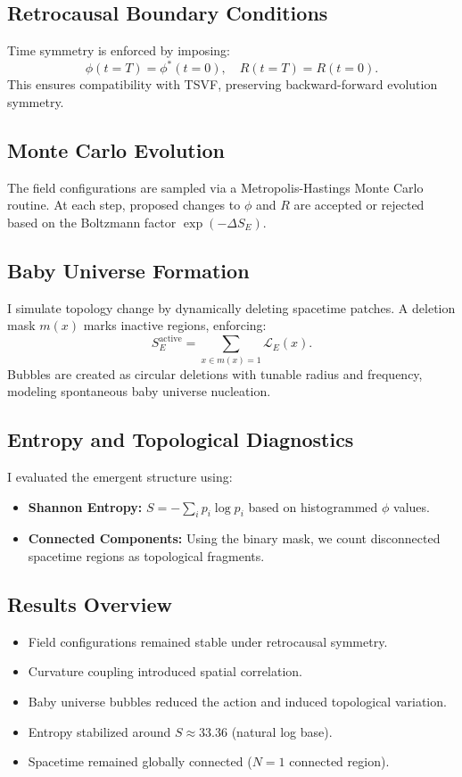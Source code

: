 \documentclass[twocolumn,superscriptaddress,floatfix]{revtex4-2}
\begin{document}
\subsection{Retrocausal Boundary Conditions}
Time symmetry is enforced by imposing:
\begin{equation}
\phi(t = T) = \phi^*(t = 0), \quad R(t = T) = R(t = 0).
\end{equation}
This ensures compatibility with TSVF, preserving backward-forward evolution symmetry.

\subsection{Monte Carlo Evolution}
The field configurations are sampled via a Metropolis-Hastings Monte Carlo routine. At each step, proposed changes to $\phi$ and $R$ are accepted or rejected based on the Boltzmann factor $\exp(-\Delta S_E)$.

\subsection{Baby Universe Formation}
I simulate topology change by dynamically deleting spacetime patches. A deletion mask $m(x)$ marks inactive regions, enforcing:
\begin{equation}
S_E^{\text{active}} = \sum_{x \in m(x)=1} \mathcal{L}_E(x).
\end{equation}
Bubbles are created as circular deletions with tunable radius and frequency, modeling spontaneous baby universe nucleation.

\subsection{Entropy and Topological Diagnostics}
I evaluated the emergent structure using:
\begin{itemize}
    \item \textbf{Shannon Entropy:} $S = -\sum_i p_i \log p_i$ based on histogrammed $\phi$ values.
    \item \textbf{Connected Components:} Using the binary mask, we count disconnected spacetime regions as topological fragments.
\end{itemize}

\subsection{Results Overview}
\begin{itemize}
    \item Field configurations remained stable under retrocausal symmetry.
    \item Curvature coupling introduced spatial correlation.
    \item Baby universe bubbles reduced the action and induced topological variation.
    \item Entropy stabilized around $S \approx 33.36$ (natural log base).
    \item Spacetime remained globally connected ($N=1$ connected region).
\end{itemize}
\end{document}
